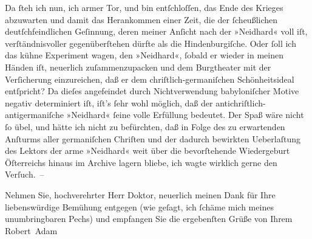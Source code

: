 \pstart
           Da{ }ſteh ich nun, ich armer
               Tor, und bin entſchloſſen, das Ende des Krieges abzuwarten und damit das
               Herankommen einer Zeit, die der{ }ſcheußlichen deutſchfeindlichen Geſinnung, deren
               meiner Anſicht nach der »Neidhard« voll iſt,
               verſtändnisvoller gegenüberſtehen dürfte als die Hindenburgiſche. Oder{ }ſoll ich das kühne Experiment wagen, den »Neidhard«,{ }ſobald er wieder in meinen Händen iſt,
               neuerlich zuſammenzupacken und dem Burgtheater mit
               der Verſicherung einzureichen, daß er dem chriſtlich-germaniſchen Schönheitsideal
               entſpricht? Da dieſes angefeindet {\pb}durch
               Nichtverwendung babyloniſcher Motive negativ
               determiniert iſt, iſt’s{ }ſehr wohl möglich, daß der antichriſtlich-antigermaniſche
                  »Neidhard«{ }ſeine volle Erfüllung bedeutet.
               Der Spaß wäre nicht{ }ſo übel, und hätte ich nicht zu befürchten, daß in Folge des zu
               erwartenden Anſturms aller germaniſchen Chriſten und der dadurch bewirkten
               Ueberlaſtung des Lektors der arme »Neidhard«
                   weit über die bevorſtehende Wiedergeburt Öſterreichs hinaus im Archive lagern bliebe, ich
               wagte wirklich gerne den Verſuch. –\pend
           
\pstart
           Nehmen Sie, hochverehrter Herr Doktor, neuerlich meinen Dank für Ihre liebenswürdige
               Bemühung entgegen (wie geſagt, ich{ }ſchäme mich meines unumbringbaren Pechs) und
               empfangen Sie die ergebenſten Grüße von Ihrem\pend
           \pstart \spacefill\mbox{Robert Adam}\pend{}\endnumbering{}  \newcommand{\dateiname}{L02260}\newcommand{\titel}{Robert Adam an Arthur Schnitzler, 16. 5. 1917}\newcommand{\editorInnen}{Martin Anton Müller und Gerd-Hermann Susen}
